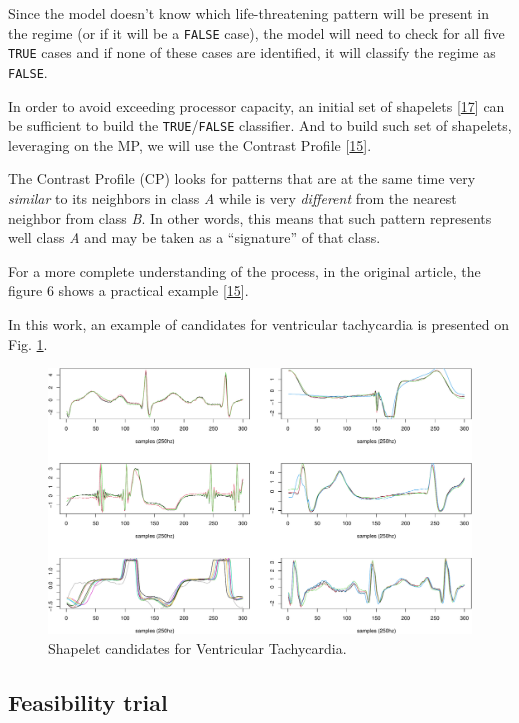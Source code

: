 \documentclass[runningheads]{llncs}
\begin{document}
Since the model doesn't know which life-threatening pattern will be present in the regime (or if it
will be a \texttt{FALSE} case), the model will need to check for all five \texttt{TRUE} cases and if none of these
cases are identified, it will classify the regime as \texttt{FALSE}.

In order to avoid exceeding processor capacity, an initial set of shapelets {[}\protect\hyperlink{ref-Rakthanmanon2013}{17}{]} can
be sufficient to build the \texttt{TRUE}/\texttt{FALSE} classifier. And to build such set of shapelets, leveraging
on the MP, we will use the Contrast Profile {[}\protect\hyperlink{ref-Mercer2021}{15}{]}.

The Contrast Profile (CP) looks for patterns that are at the same time very \emph{similar} to its
neighbors in class \emph{A} while is very \emph{different} from the nearest neighbor from class \emph{B}. In other
words, this means that such pattern represents well class \emph{A} and may be taken as a ``signature'' of
that class.

For a more complete understanding of the process, in the original article, the figure 6 shows a
practical example {[}\protect\hyperlink{ref-Mercer2021}{15}{]}.

In this work, an example of candidates for ventricular tachycardia is presented on Fig. \ref{fig:vtachy}.

\begin{figure}

{\centering \includegraphics[width=0.9\linewidth]{epia2022_files/figure-latex/vtachy-1} 

}

\caption{Shapelet candidates for Ventricular Tachycardia.}\label{fig:vtachy}
\end{figure}

\hypertarget{feasibility-trial}{%
\subsection{Feasibility trial}\label{feasibility-trial}}
\end{document}
